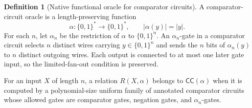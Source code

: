 \documentclass[10pt,a4paper]{article}
\theoremstyle{definition}
\newtheorem*{definition*}{Definition}
\begin{document}
\begin{definition*}[Native functional oracle for comparator circuits]
A comparator-circuit oracle is a length-preserving function
\begin{equation}
  \alpha:\{0,1\}^*\longrightarrow\{0,1\}^*,
  \qquad
  |\alpha(y)|=|y|.
\end{equation}
For each $n$, let $\alpha_n$ be the restriction of $\alpha$ to $\{0,1\}^n$.
An $\alpha_n$-gate in a comparator circuit selects $n$ distinct wires carrying
$y\in\{0,1\}^n$ and sends the $n$ bits of $\alpha_n(y)$ to $n$ distinct
outgoing wires. Each output is connected to at most one later gate input, so
the limited-fan-out condition is preserved.

For an input $X$ of length $n$, a relation $R(X,\alpha)$ belongs to
$\mathsf{CC}(\alpha)$ when it is computed by a polynomial-size uniform family
of annotated comparator circuits whose allowed gates are comparator gates,
negation gates, and $\alpha_n$-gates.
\end{definition*}
\end{document}
